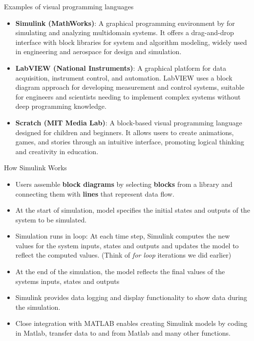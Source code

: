 \begin{frame}{Examples of visual programming languages}
\small
\begin{itemize}
    \item \textbf{Simulink (MathWorks)}: A graphical programming environment by for simulating and analyzing multidomain systems. It offers a drag-and-drop interface with block libraries for system and algorithm modeling, widely used in engineering and aerospace for design and simulation.
    
    \item \textbf{LabVIEW (National Instruments)}:
    A graphical platform for data acquisition, instrument control, and automation. LabVIEW uses a block diagram approach for developing measurement and control systems, suitable for engineers and scientists needing to implement complex systems without deep programming knowledge.

    \item \textbf{Scratch (MIT Media Lab)}:
    A block-based visual programming language designed for children and beginners. It allows users to create animations, games, and stories through an intuitive interface, promoting logical thinking and creativity in education.
\end{itemize}
\end{frame}


\begin{frame}{How Simulink Works}
\small
  \begin{itemize}
    \item Users assemble \textbf{block diagrams} by selecting \textbf{blocks} from a library and connecting them with \textbf{lines} that represent data flow. 
    \pause
    \item At the start of simulation, model specifies the initial states and outputs of the system to be simulated.
    \pause
    \item Simulation runs in loop: At each time step, Simulink computes the new values for the system inputs, states and outputs and updates the model to reflect the computed values. (Think of \textit{for loop} iterations we did earlier)  
    \pause
    \item At the end of the simulation, the model reflects the final values of the systems inputs, states and outputs
    \pause
    \item  Simulink provides data logging and display functionality to show data during the simulation.
    \item Close integration with MATLAB enables creating Simulink models by coding in Matlab, transfer data to and from Matlab and many other functions.
\end{itemize}
\end{frame}

